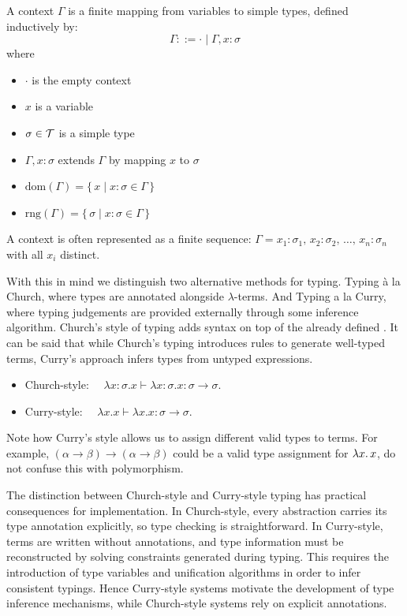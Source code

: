 \begin{definition} A context $\Gamma$ is a finite mapping from variables to simple types, defined inductively by:
\[
\Gamma ::= \cdot \mid \Gamma, x : \sigma
\]
where
\begin{itemize}
\item $\cdot$ is the empty context
\item $x$ is a variable
\item $\sigma \in \mathcal{T}$ is a simple type
\item $\Gamma, x : \sigma$ extends $\Gamma$ by mapping $x$ to $\sigma$
\item \( \mathrm{dom}(\Gamma) = \{\, x \mid x : \sigma \in \Gamma \,\}\)
\item \( \mathrm{rng}(\Gamma) = \{\, \sigma \mid x : \sigma \in \Gamma \,\} \)
\end{itemize}
A context is often represented as a finite sequence:
\(
  \Gamma = x_1 : \sigma_1,\, x_2 : \sigma_2,\, \dots,\, x_n : \sigma_n
\)
with all $x_i$ distinct.
\end{definition}

With this in mind we distinguish two alternative methods for typing. Typing à la Church, where types are annotated alongside $\lambda$-terms. And Typing a la Curry, where typing judgements are provided externally through some inference algorithm. Church's style of typing adds syntax on top of the already defined \lcalc. It can be said that while Church's typing introduces rules to generate well-typed terms, Curry's approach infers types from untyped expressions.
\begin{itemize}
\item Church-style:
  \(
  \quad
    \lambda x : \sigma . x
    \vdash \lambda x : \sigma . x : \sigma \to \sigma
  \).
\item Curry-style:
  \(
    \quad
    \lambda x . x
    \vdash \lambda x . x : \sigma \to \sigma
  \).
\end{itemize}
Note how Curry's style allows us to assign different valid types to terms. For example, $(\alpha \to \beta) \to (\alpha \to \beta)$ could be a valid type assignment for $\lambda x . \, x$, do not confuse this with  polymorphism.

\begin{remark}
The distinction between Church-style and Curry-style typing has practical consequences for implementation. 
In Church-style, every abstraction carries its type annotation explicitly, so type checking is straightforward. 
In Curry-style, terms are written without annotations, and type information must be reconstructed by solving constraints generated during typing. 
This requires the introduction of type variables and unification algorithms in order to infer consistent typings.
Hence Curry-style systems motivate the development of type inference mechanisms, while Church-style systems rely on explicit annotations.
\end{remark}


